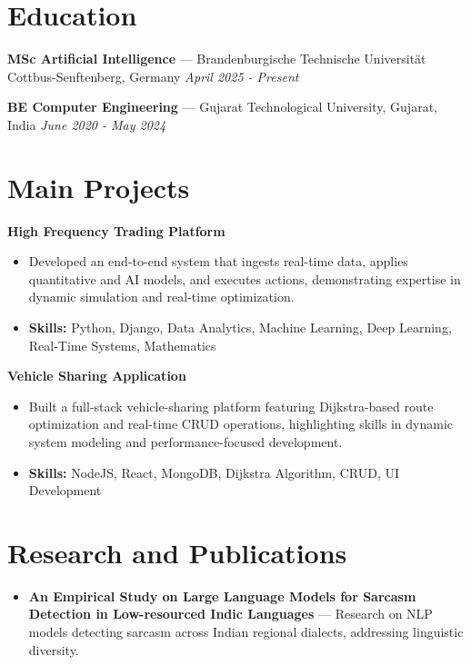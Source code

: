 \documentclass[a4paper,10pt]{article}
\begin{document}
\section*{Education}
\textbf{MSc Artificial Intelligence} — Brandenburgische Technische Universität Cottbus-Senftenberg, Germany \hfill \textit{April 2025 - Present}\par
\vspace{1.5pt}
\textbf{BE Computer Engineering} — Gujarat Technological University, Gujarat, India \hfill \textit{June 2020 - May 2024}\par

\section*{Main Projects}
\textbf{High Frequency Trading Platform}\par
\vspace{1pt}
\begin{itemize}
  \item Developed an end-to-end system that ingests real-time data, applies quantitative and AI models, and executes actions, demonstrating expertise in dynamic simulation and real-time optimization.
  \item \textbf{Skills:} Python, Django, Data Analytics, Machine Learning, Deep Learning, Real-Time Systems, Mathematics
\end{itemize}
\vspace{3pt}
\textbf{Vehicle Sharing Application}\par
\vspace{1pt}
\begin{itemize}
  \item Built a full-stack vehicle-sharing platform featuring Dijkstra-based route optimization and real-time CRUD operations, highlighting skills in dynamic system modeling and performance-focused development.
  \item \textbf{Skills:} NodeJS, React, MongoDB, Dijkstra Algorithm, CRUD, UI Development
\end{itemize}

\section*{Research and Publications}
\begin{itemize}
\item \textbf{An Empirical Study on Large Language Models for Sarcasm Detection in Low-resourced Indic Languages} — Research on NLP models detecting sarcasm across Indian regional dialects, addressing linguistic diversity.
\end{itemize}
\end{document}
